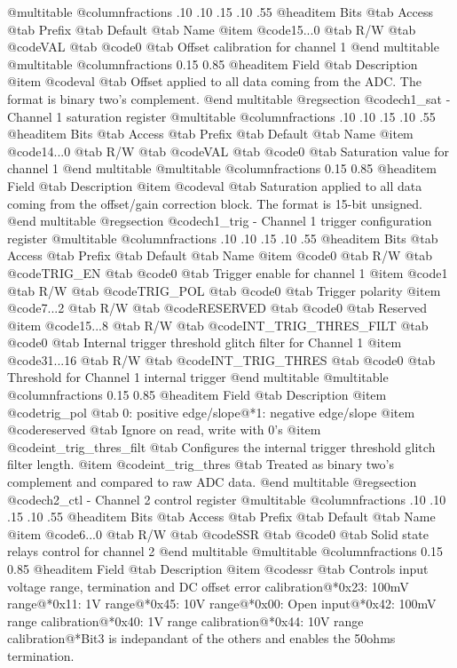 @multitable @columnfractions .10 .10 .15 .10 .55
@headitem Bits @tab Access @tab Prefix @tab Default @tab Name
@item @code{15...0}
@tab R/W @tab
@code{VAL}
@tab @code{0} @tab 
Offset calibration for channel 1
@end multitable
@multitable @columnfractions 0.15 0.85
@headitem Field @tab Description
@item @code{val} @tab Offset applied to all data coming from the ADC. The format is binary two's complement.
@end multitable
@regsection @code{ch1_sat} - Channel 1 saturation register
@multitable @columnfractions .10 .10 .15 .10 .55
@headitem Bits @tab Access @tab Prefix @tab Default @tab Name
@item @code{14...0}
@tab R/W @tab
@code{VAL}
@tab @code{0} @tab 
Saturation value for channel 1
@end multitable
@multitable @columnfractions 0.15 0.85
@headitem Field @tab Description
@item @code{val} @tab Saturation applied to all data coming from the offset/gain correction block. The format is 15-bit unsigned.
@end multitable
@regsection @code{ch1_trig} - Channel 1 trigger configuration register
@multitable @columnfractions .10 .10 .15 .10 .55
@headitem Bits @tab Access @tab Prefix @tab Default @tab Name
@item @code{0}
@tab R/W @tab
@code{TRIG_EN}
@tab @code{0} @tab 
Trigger enable for channel 1
@item @code{1}
@tab R/W @tab
@code{TRIG_POL}
@tab @code{0} @tab 
Trigger polarity
@item @code{7...2}
@tab R/W @tab
@code{RESERVED}
@tab @code{0} @tab 
Reserved
@item @code{15...8}
@tab R/W @tab
@code{INT_TRIG_THRES_FILT}
@tab @code{0} @tab 
Internal trigger threshold glitch filter for Channel 1
@item @code{31...16}
@tab R/W @tab
@code{INT_TRIG_THRES}
@tab @code{0} @tab 
Threshold for Channel 1 internal trigger
@end multitable
@multitable @columnfractions 0.15 0.85
@headitem Field @tab Description
@item @code{trig_pol} @tab 0: positive edge/slope@*1: negative edge/slope
@item @code{reserved} @tab Ignore on read, write with 0's
@item @code{int_trig_thres_filt} @tab Configures the internal trigger threshold glitch filter length.
@item @code{int_trig_thres} @tab Treated as binary two's complement and compared to raw ADC data.
@end multitable
@regsection @code{ch2_ctl} - Channel 2 control register
@multitable @columnfractions .10 .10 .15 .10 .55
@headitem Bits @tab Access @tab Prefix @tab Default @tab Name
@item @code{6...0}
@tab R/W @tab
@code{SSR}
@tab @code{0} @tab 
Solid state relays control for channel 2
@end multitable
@multitable @columnfractions 0.15 0.85
@headitem Field @tab Description
@item @code{ssr} @tab Controls input voltage range, termination and DC offset error calibration@*0x23: 100mV range@*0x11: 1V range@*0x45: 10V range@*0x00: Open input@*0x42: 100mV range calibration@*0x40: 1V range calibration@*0x44: 10V range calibration@*Bit3 is indepandant of the others and enables the 50ohms termination.
